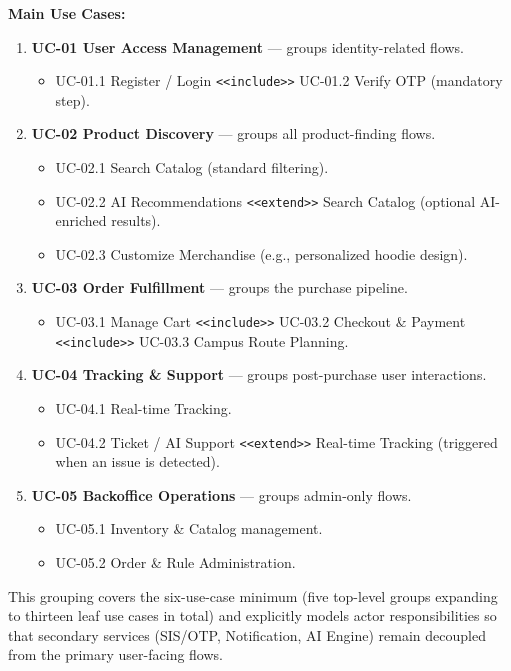 \documentclass[11pt,a4paper]{article}
\begin{document}
\noindent\textbf{Main Use Cases:}
\begin{enumerate}
    \item \textbf{UC-01 User Access Management} --- groups identity-related flows.
    \begin{itemize}
        \item UC-01.1 Register / Login \texttt{<<include>>} UC-01.2 Verify OTP (mandatory step).
    \end{itemize}
    \item \textbf{UC-02 Product Discovery} --- groups all product-finding flows.
    \begin{itemize}
        \item UC-02.1 Search Catalog (standard filtering).
        \item UC-02.2 AI Recommendations \texttt{<<extend>>} Search Catalog (optional AI-enriched results).
        \item UC-02.3 Customize Merchandise (e.g., personalized hoodie design).
    \end{itemize}
    \item \textbf{UC-03 Order Fulfillment} --- groups the purchase pipeline.
    \begin{itemize}
        \item UC-03.1 Manage Cart \texttt{<<include>>} UC-03.2 Checkout \& Payment \texttt{<<include>>} UC-03.3 Campus Route Planning.
    \end{itemize}
    \item \textbf{UC-04 Tracking \& Support} --- groups post-purchase user interactions.
    \begin{itemize}
        \item UC-04.1 Real-time Tracking.
        \item UC-04.2 Ticket / AI Support \texttt{<<extend>>} Real-time Tracking (triggered when an issue is detected).
    \end{itemize}
    \item \textbf{UC-05 Backoffice Operations} --- groups admin-only flows.
    \begin{itemize}
        \item UC-05.1 Inventory \& Catalog management.
        \item UC-05.2 Order \& Rule Administration.
    \end{itemize}
\end{enumerate}

This grouping covers the six-use-case minimum (five top-level groups expanding to thirteen leaf use cases in total) and explicitly models actor responsibilities so that secondary services (SIS/OTP, Notification, AI Engine) remain decoupled from the primary user-facing flows.
\end{document}
